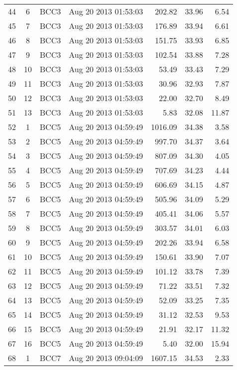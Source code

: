 \documentclass{article}
\begin{document}
\begin{longtable}{ccllrrr}
44 & 6 & BCC3 & Aug 20 2013 01:53:03 & 202.82 & 33.96 & 6.54 \\
45 & 7 & BCC3 & Aug 20 2013 01:53:03 & 176.89 & 33.94 & 6.61 \\
46 & 8 & BCC3 & Aug 20 2013 01:53:03 & 151.75 & 33.93 & 6.85 \\
47 & 9 & BCC3 & Aug 20 2013 01:53:03 & 102.54 & 33.88 & 7.28 \\
48 & 10 & BCC3 & Aug 20 2013 01:53:03 & 53.49 & 33.43 & 7.29 \\
49 & 11 & BCC3 & Aug 20 2013 01:53:03 & 30.96 & 32.93 & 7.87 \\
50 & 12 & BCC3 & Aug 20 2013 01:53:03 & 22.00 & 32.70 & 8.49 \\
51 & 13 & BCC3 & Aug 20 2013 01:53:03 & 5.83 & 32.08 & 11.87 \\
\hline
52 & 1 & BCC5 & Aug 20 2013 04:59:49 & 1016.09 & 34.38 & 3.58 \\
53 & 2 & BCC5 & Aug 20 2013 04:59:49 & 997.70 & 34.37 & 3.64 \\
54 & 3 & BCC5 & Aug 20 2013 04:59:49 & 807.09 & 34.30 & 4.05 \\
55 & 4 & BCC5 & Aug 20 2013 04:59:49 & 707.69 & 34.23 & 4.44 \\
56 & 5 & BCC5 & Aug 20 2013 04:59:49 & 606.69 & 34.15 & 4.87 \\
57 & 6 & BCC5 & Aug 20 2013 04:59:49 & 505.96 & 34.09 & 5.29 \\
58 & 7 & BCC5 & Aug 20 2013 04:59:49 & 405.41 & 34.06 & 5.57 \\
59 & 8 & BCC5 & Aug 20 2013 04:59:49 & 303.57 & 34.01 & 6.03 \\
60 & 9 & BCC5 & Aug 20 2013 04:59:49 & 202.26 & 33.94 & 6.58 \\
61 & 10 & BCC5 & Aug 20 2013 04:59:49 & 150.61 & 33.90 & 7.07 \\
62 & 11 & BCC5 & Aug 20 2013 04:59:49 & 101.12 & 33.78 & 7.39 \\
63 & 12 & BCC5 & Aug 20 2013 04:59:49 & 71.22 & 33.51 & 7.32 \\
64 & 13 & BCC5 & Aug 20 2013 04:59:49 & 52.09 & 33.25 & 7.35 \\
65 & 14 & BCC5 & Aug 20 2013 04:59:49 & 31.12 & 32.53 & 9.53 \\
66 & 15 & BCC5 & Aug 20 2013 04:59:49 & 21.91 & 32.17 & 11.32 \\
67 & 16 & BCC5 & Aug 20 2013 04:59:49 & 5.40 & 32.00 & 15.94 \\
\hline
68 & 1 & BCC7 & Aug 20 2013 09:04:09 & 1607.15 & 34.53 & 2.33 \\

\end{longtable}
\end{document}
